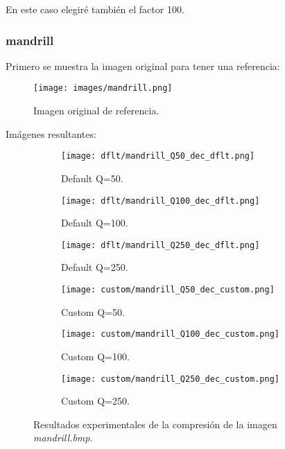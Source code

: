 \documentclass[12pt,a4paper]{article}
\begin{document}
En este caso elegiré también el factor 100.

\subsubsection{mandrill}
Primero se muestra la imagen original para tener una referencia:
\begin{figure}[H]
    \centering
    \texttt{[image: images/mandrill.png]}
    \caption[Referencia - mandrill]{Imagen original de referencia.}
    
\end{figure}
    
    \vspace{0.5cm}

Imágenes resultantes:
\begin{figure}   [H]
    \begin{subfigure}{0.30\textwidth}
        \centering
        \texttt{[image: dflt/mandrill\_Q50\_dec\_dflt.png]}
        \caption{Default Q=50.}
        
    \end{subfigure}
    \hfill
    \begin{subfigure}{0.30\textwidth}
        \centering
        \texttt{[image: dflt/mandrill\_Q100\_dec\_dflt.png]}
        \caption{Default Q=100.}
        
    \end{subfigure}
    \hfill
    \begin{subfigure}{0.30\textwidth}
        \centering
        \texttt{[image: dflt/mandrill\_Q250\_dec\_dflt.png]}
        \caption{Default Q=250.}
        
    \end{subfigure}
    
    \vspace{0.5cm}
    
    \begin{subfigure}{0.30\textwidth}
        \centering
        \texttt{[image: custom/mandrill\_Q50\_dec\_custom.png]}
        \caption{Custom Q=50.}
        
    \end{subfigure}
    \hfill
    \begin{subfigure}{0.30\textwidth}
        \centering
        \texttt{[image: custom/mandrill\_Q100\_dec\_custom.png]}
        \caption{Custom Q=100.}
        
    \end{subfigure}
    \hfill
    \begin{subfigure}{0.30\textwidth}
        \centering
        \texttt{[image: custom/mandrill\_Q250\_dec\_custom.png]}
        \caption{Custom Q=250.}
        
    \end{subfigure}
    
    \caption[Resultados experimentales - mandrill]{Resultados experimentales de la compresión de la imagen \textit{mandrill.bmp}.}
    
\end{figure}
\end{document}
